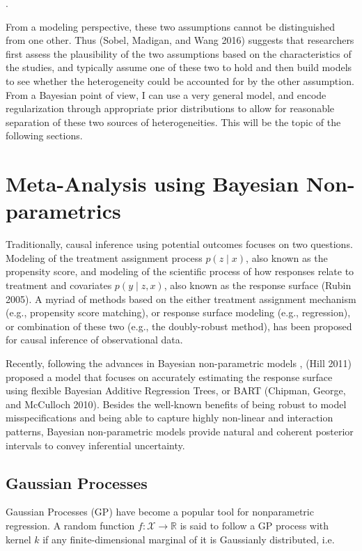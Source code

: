 .

From a modeling perspective, these two assumptions cannot be
distinguished from one other. Thus (Sobel, Madigan, and Wang 2016)
suggests that researchers first assess the plausibility of the two
assumptions based on the characteristics of the studies, and typically
assume one of these two to hold and then build models to see whether the
heterogeneity could be accounted for by the other assumption. From a
Bayesian point of view, I can use a very general model, and encode
regularization through appropriate prior distributions to allow for
reasonable separation of these two sources of heterogeneities. This will
be the topic of the following sections.

\section{Meta-Analysis using Bayesian
Non-parametrics}\label{meta-analysis-using-bayesian-non-parametrics}

Traditionally, causal inference using potential outcomes focuses on two
questions. Modeling of the treatment assignment process \(p(z\mid x)\),
also known as the propensity score, and modeling of the scientific
process of how responses relate to treatment and covariates
\(p(y\mid z, x)\), also known as the response surface (Rubin 2005). A
myriad of methods based on the either treatment assignment mechanism
(e.g., propensity score matching), or response surface modeling (e.g.,
regression), or combination of these two (e.g., the doubly-robust
method), has been proposed for causal inference of observational data.

Recently, following the advances in Bayesian non-parametric models ,
(Hill 2011) proposed a model that focuses on accurately estimating the
response surface using flexible Bayesian Additive Regression Trees, or
BART (Chipman, George, and McCulloch 2010). Besides the well-known
benefits of being robust to model misspecifications and being able to
capture highly non-linear and interaction patterns, Bayesian
non-parametric models provide natural and coherent posterior intervals
to convey inferential uncertainty.

\subsection{Gaussian Processes}\label{gaussian-processes}

Gaussian Processes (GP) have become a popular tool for nonparametric
regression. A random function \(f:\mathcal{X}\rightarrow\mathbb{R}\) is
said to follow a GP process with kernel \(k\) if any finite-dimensional
marginal of it is Gaussianly distributed, i.e.

